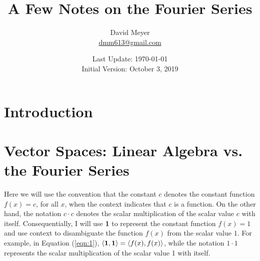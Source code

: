 \documentclass{article}
\title{A Few Notes on the Fourier Series}
\author{David Meyer \\ \href{mailto:dmm613@gmail.com}
                            {dmm613@gmail.com}}
\date{Last Update: \today \\
	 {\vspace{1.00mm} \small Initial Version: October 3, 2019}}
\theoremstyle{definition}
\begin{document}
\maketitle
%
%
%
\section{Introduction}
\label{sec:introduction}

\section{Vector Spaces: Linear Algebra vs. the Fourier Series}
\label{section:vector_spaces}
Here we will use the convention that the constant $c$ denotes 
the constant function $f(x) = c$, for all $x$, when the context 
indicates that $c$ is a function. On the other hand, the notation
$c \cdot c$ denotes the scalar multiplication of the scalar value 
$c$ with itself. Consequentially, I will use {\bf 1} to represent 
the constant function $f(x) = 1$ and use context to disambiguate 
the function $f(x)$ from the scalar value $1$. For example, in 
Equation (\ref{eqn:1}), $\langle {\bf 1},{\bf 1} \rangle = \langle 
f(x),f(x) \rangle$, while the notation $1 \cdot 1$ represents the scalar 
multiplication of the scalar value 1 with itself.

\setlength{\tabcolsep}{15pt}
\renewcommand{\arraystretch}{3.00}
\end{document}
